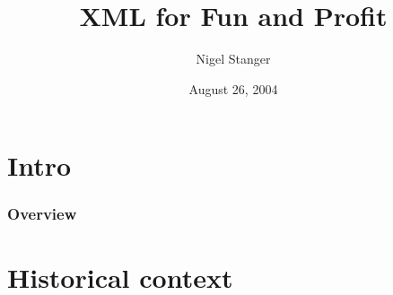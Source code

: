 %
%
%
%


\usepackage{beamerthemenzcs}
\usepackage{pgf,pgfarrows,pgfnodes}
\usepackage{graphicx}
\usepackage{calc}
\usepackage[absolute,overlay]{textpos}
\usepackage[normalem]{ulem}


\graphicspath{{images/}}


\setlength{\TPHorizModule}{1cm}
\setlength{\TPVertModule}{1cm}


\renewcommand{\ttdefault}{blg}

\footerright{\insertframenumber}

\author{Nigel Stanger}
\title{\textbf{XML for Fun and Profit}}
\date{August 26, 2004}







\frame{\titlepage}




\section*{Intro}




\frame
{
	\frametitle{Overview}
	
	\tableofcontents
}




\section{Historical context}




